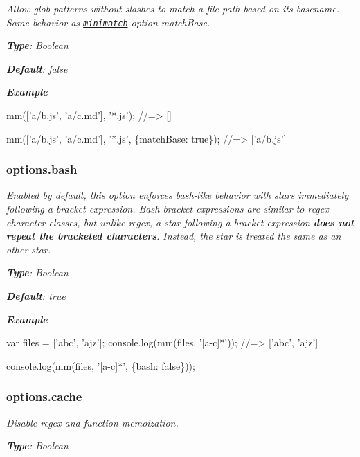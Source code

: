 {\itshape }

{\itshape Allow glob patterns without slashes to match a file path based on its basename. Same behavior as \href{https://github.com/isaacs/minimatch}{\tt minimatch} option {\ttfamily match\+Base}.}

{\itshape {\bfseries Type}\+: {\ttfamily Boolean}}

{\itshape {\bfseries Default}\+: {\ttfamily false}}

{\itshape {\bfseries Example}}

{\itshape 
\begin{DoxyCode}
mm(['a/b.js', 'a/c.md'], '*.js');
//=> []

mm(['a/b.js', 'a/c.md'], '*.js', \{matchBase: true\});
//=> ['a/b.js']
\end{DoxyCode}
}

{\itshape \subsubsection*{options.\+bash}}

{\itshape }

{\itshape Enabled by default, this option enforces bash-\/like behavior with stars immediately following a bracket expression. Bash bracket expressions are similar to regex character classes, but unlike regex, a star following a bracket expression {\bfseries does not repeat the bracketed characters}. Instead, the star is treated the same as an other star.}

{\itshape {\bfseries Type}\+: {\ttfamily Boolean}}

{\itshape {\bfseries Default}\+: {\ttfamily true}}

{\itshape {\bfseries Example}}

{\itshape 
\begin{DoxyCode}
var files = ['abc', 'ajz'];
console.log(mm(files, '[a-c]*'));
//=> ['abc', 'ajz']

console.log(mm(files, '[a-c]*', \{bash: false\}));
\end{DoxyCode}
}

{\itshape \subsubsection*{options.\+cache}}

{\itshape }

{\itshape Disable regex and function memoization.}

{\itshape {\bfseries Type}\+: {\ttfamily Boolean}}

